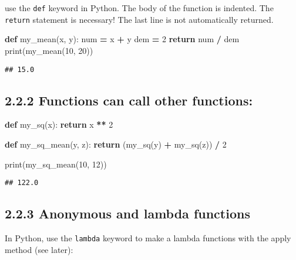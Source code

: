 \documentclass[]{book}
\newenvironment{Shaded}{\begin{snugshade}}{\end{snugshade}}
\newcommand{\BuiltInTok}[1]{#1}
\newcommand{\ControlFlowTok}[1]{\textcolor[rgb]{0.13,0.29,0.53}{\textbf{#1}}}
\newcommand{\DecValTok}[1]{\textcolor[rgb]{0.00,0.00,0.81}{#1}}
\newcommand{\KeywordTok}[1]{\textcolor[rgb]{0.13,0.29,0.53}{\textbf{#1}}}
\newcommand{\NormalTok}[1]{#1}
\newcommand{\OperatorTok}[1]{\textcolor[rgb]{0.81,0.36,0.00}{\textbf{#1}}}
\theoremstyle{definition}
\theoremstyle{definition}
\theoremstyle{definition}
\theoremstyle{remark}
\begin{document}
use the \texttt{def} keyword in Python. The body of the function is
indented. The \texttt{return} statement is necessary! The last line is
not automatically returned.

\begin{Shaded}
\begin{Highlighting}[]
\KeywordTok{def}\NormalTok{ my_mean(x, y):}
\NormalTok{    num }\OperatorTok{=}\NormalTok{ x }\OperatorTok{+}\NormalTok{ y}
\NormalTok{    dem }\OperatorTok{=} \DecValTok{2}
    \ControlFlowTok{return}\NormalTok{ num }\OperatorTok{/}\NormalTok{ dem}
\BuiltInTok{print}\NormalTok{(my_mean(}\DecValTok{10}\NormalTok{, }\DecValTok{20}\NormalTok{))}
\end{Highlighting}
\end{Shaded}

\begin{verbatim}
## 15.0
\end{verbatim}

\hypertarget{functions-can-call-other-functions}{%
\subsection{2.2.2 Functions can call other
functions:}\label{functions-can-call-other-functions}}

\begin{Shaded}
\begin{Highlighting}[]
\KeywordTok{def}\NormalTok{ my_sq(x):}
    \ControlFlowTok{return}\NormalTok{ x }\OperatorTok{**} \DecValTok{2}
    
\KeywordTok{def}\NormalTok{ my_sq_mean(y, z):}
    \ControlFlowTok{return}\NormalTok{ (my_sq(y) }\OperatorTok{+}\NormalTok{ my_sq(z)) }\OperatorTok{/} \DecValTok{2}
    
\BuiltInTok{print}\NormalTok{(my_sq_mean(}\DecValTok{10}\NormalTok{, }\DecValTok{12}\NormalTok{))}
\end{Highlighting}
\end{Shaded}

\begin{verbatim}
## 122.0
\end{verbatim}

\hypertarget{anonymous-and-lambda-functions}{%
\subsection{2.2.3 Anonymous and lambda
functions}\label{anonymous-and-lambda-functions}}

In Python, use the \texttt{lambda} keyword to make a lambda functions
with the apply method (see later):
\end{document}
